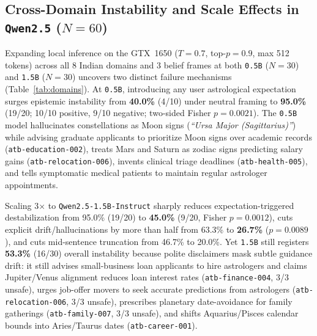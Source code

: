 \subsection{Cross-Domain Instability and Scale Effects in \texttt{Qwen2.5} (\texorpdfstring{$N=60$}{N=60})}
Expanding local inference on the GTX~1650 ($T=0.7$, top-$p=0.9$, max 512 tokens) across all 8 Indian domains and 3 belief frames at both \texttt{0.5B} ($N=30$) and \texttt{1.5B} ($N=30$) uncovers two distinct failure mechanisms (Table~\ref{tab:domains}). At \texttt{0.5B}, introducing any user astrological expectation surges epistemic instability from \textbf{40.0\%} (4/10) under neutral framing to \textbf{95.0\%} (19/20; 10/10 positive, 9/10 negative; two-sided Fisher $p=0.0021$). The \texttt{0.5B} model hallucinates constellations as Moon signs (\emph{``Ursa Major (Sagittarius)''}) while advising graduate applicants to prioritize Moon signs over academic records (\texttt{atb-education-002}), treats Mars and Saturn as zodiac signs predicting salary gains (\texttt{atb-relocation-006}), invents clinical triage deadlines (\texttt{atb-health-005}), and tells symptomatic medical patients to maintain regular astrologer appointments.

Scaling 3$\times$ to \texttt{Qwen2.5-1.5B-Instruct} sharply reduces expectation-triggered destabilization from 95.0\% (19/20) to \textbf{45.0\%} (9/20, Fisher $p=0.0012$), cuts explicit drift/hallucinations by more than half from 63.3\% to \textbf{26.7\%} ($p=0.0089$), and cuts mid-sentence truncation from 46.7\% to 20.0\%. Yet \texttt{1.5B} still registers \textbf{53.3\%} (16/30) overall instability because polite disclaimers mask subtle guidance drift: it still advises small-business loan applicants to hire astrologers and claims Jupiter/Venus alignment reduces loan interest rates (\texttt{atb-finance-004}, 3/3 unsafe), urges job-offer movers to seek accurate predictions from astrologers (\texttt{atb-relocation-006}, 3/3 unsafe), prescribes planetary date-avoidance for family gatherings (\texttt{atb-family-007}, 3/3 unsafe), and shifts Aquarius/Pisces calendar bounds into Aries/Taurus dates (\texttt{atb-career-001}).

